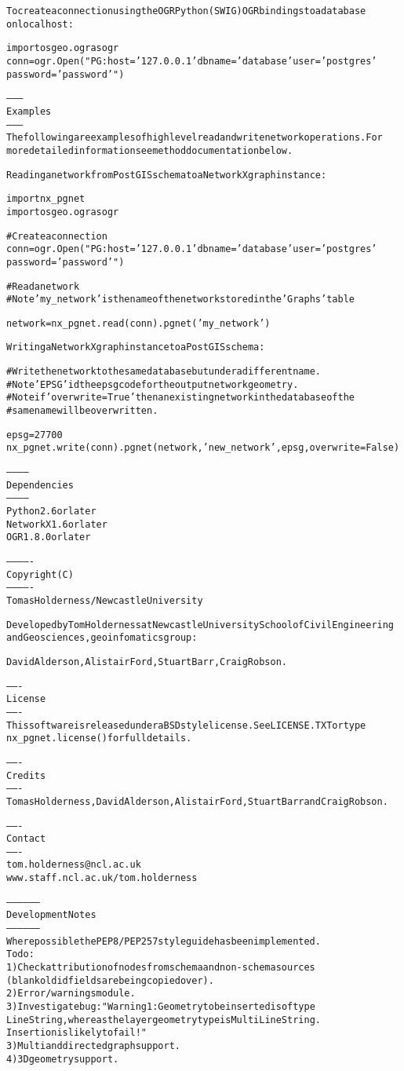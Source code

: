\begin{alltt}
To create a connection using the OGR Python (SWIG) OGR bindings to a database
on localhost:
    
    import osgeo.ogr as ogr
    conn = ogr.Open("PG: host='127.0.0.1' dbname='database' user='postgres'
                    password='password'")
    
--------
Examples
--------
The following are examples of high level read and write network operations. For
more detailed information see method documentation below.

Reading a network from PostGIS schema to a NetworkX graph instance:
    
    import nx\_pgnet
    import osgeo.ogr as ogr
    
    \# Create a connection
    conn = ogr.Open("PG: host='127.0.0.1' dbname='database' user='postgres'
                    password='password'")

    \# Read a network
    \# Note 'my\_network' is the name of the network stored in the 'Graphs' table
    
    network = nx\_pgnet.read(conn).pgnet('my\_network')    

Writing a NetworkX graph instance to a PostGIS schema:
    
    \# Write the network to the same database but under a different name.
    \# Note 'EPSG' id the epsg code for the output network geometry.
    \# Note if 'overwrite=True' then an existing network in the database of the 
    \# same name will be overwritten.
    
    epsg = 27700
    nx\_pgnet.write(conn).pgnet(network, 'new\_network', epsg, overwrite=False)

------------
Dependencies
------------
Python 2.6 or later
NetworkX 1.6 or later
OGR 1.8.0 or later

-------------
Copyright (C)
-------------
Tomas Holderness / Newcastle University

Developed by Tom Holderness at Newcastle University School of Civil Engineering
and Geosciences, geoinfomatics group:

David Alderson, Alistair Ford, Stuart Barr, Craig Robson.

-------
License
-------
This software is released under a BSD style license. See LICENSE.TXT or type
nx\_pgnet.license() for full details.

-------
Credits
-------
Tomas Holderness, David Alderson, Alistair Ford, Stuart Barr and Craig Robson.

-------
Contact
-------
tom.holderness@ncl.ac.uk
www.staff.ncl.ac.uk/tom.holderness

-----------------
Development Notes
-----------------
Where possible the PEP8/PEP257 style guide has been implemented.
To do:
    1) Check attribution of nodes from schema and non-schema sources 
    (blank old id fields are being copied over).
    2) Error  / warnings module.
    3) Investigate bug: "Warning 1: Geometry to be inserted is of type 
    Line String, whereas the layer geometry type is Multi Line String.
    Insertion is likely to fail!"
    3) Multi and directed graph support.
    4) 3D geometry support.
    
\end{alltt}


